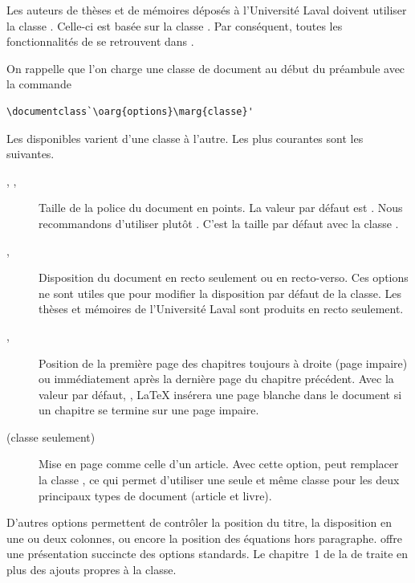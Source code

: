 Les auteurs de thèses et de mémoires déposés à l'Université Laval
doivent utiliser la classe  \citep{ulthese}. Celle-ci
est basée sur la classe . Par conséquent, toutes les
fonctionnalités de  se retrouvent dans .

On rappelle que l'on charge une classe de document au début du
préambule avec la commande
\begin{lstlisting}
\documentclass`\oarg{options}\marg{classe}'
\end{lstlisting}
Les  disponibles varient d'une classe à l'autre. Les
plus courantes sont les suivantes.
\begin{description}
\item[\mdseries \code{10pt}, \code{11pt}, \code{12pt}] Taille de la
  police du document en points. La valeur par défaut est \code{10pt}.
  Nous recommandons d'utiliser plutôt \code{11pt}. C'est la taille par
  défaut avec la classe .
\item[\mdseries {}, ] Disposition du
  document en recto seulement ou en recto-verso. Ces options ne sont
  utiles que pour modifier la disposition par défaut de la classe. Les
  thèses et mémoires de l'Université Laval sont produits en recto
  seulement.
\item[\mdseries {}, ] Position de la
  première page des chapitres toujours à droite (page impaire) ou
  immédiatement après la dernière page du chapitre précédent. Avec la
  valeur par défaut, , {\LaTeX} insérera une page
  blanche dans le document si un chapitre se termine sur une page
  impaire.
\item[\mdseries {} (classe  seulement)] Mise
  en page comme celle d'un article. Avec cette option, 
  peut remplacer la classe , ce qui permet d'utiliser
  une seule et même classe pour les deux principaux types de document
  (article et livre).
\end{description}

D'autres options permettent de contrôler la position du titre, la
disposition en une ou deux colonnes, ou encore la position des
équations hors paragraphe. \citet{Thurnherr:class-options} offre une
présentation succincte des options standards. Le chapitre~1 de la %
de  traite en plus des ajouts propres à la classe.



